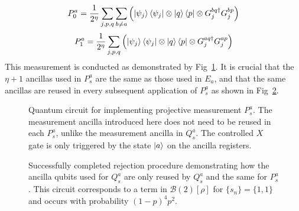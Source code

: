 \documentclass[aps,floatfix,10pt,amssymb,amsfont,amsmath,superscriptaddress,float,nofootinbib,longbibliography,nobalancelastpage,twocolumn]{revtex4-2}
\begin{document}
\begin{equation}
    P^a_0 = \frac{1}{2^{\eta}}\sum_{j,p,q} \sum_{b\neq a}\left( \ket{\psi_j}\bra{\psi_j} \otimes \ket{q}\bra{p} \otimes G_j^{bq\dagger}G_j^{bp} \right)
\end{equation}
\begin{equation}
    P^a_1 = \frac{1}{2^{\eta}}\sum_{j,p,q} \left( \ket{\psi_j}\bra{\psi_j} \otimes \ket{q}\bra{p} \otimes G_j^{aq\dagger}G_j^{ap} \right)
\end{equation}
This measurement is conducted as demonstrated by Fig~\ref{fig:Pcircuit}. It is crucial that the $\eta + 1$ ancillas used in $P_s^a$ are the same as those used in $E_a$, and that the same ancillas are reused in every subsequent application of $P_s^a$ as shown in Fig~\ref{fig:fullcircuit}.
\begin{figure}

\caption{Quantum circuit for implementing projective measurement $P_s^a$. The measurement ancilla introduced here does not need to be reused in each $P_s^a$, unlike the measurement ancilla in $Q_s^a$. The controlled $X$ gate is only triggered by the state $\ket{a}$ on the ancilla registers.}
\label{fig:Pcircuit}
\end{figure}
\begin{figure}
\caption{Successfully completed rejection procedure demonstrating how the ancilla qubits used for $Q_s^a$ are only reused by $Q_s^a$ and the same for $P_s^a$. This circuit corresponds to a term in $\mathcal{B}(2)[\rho]$ for $\{s_n\} = \{1,1\}$ and occurs with probability $(1-p)^4p^2$.}
\label{fig:fullcircuit}
\end{figure}
\end{document}
